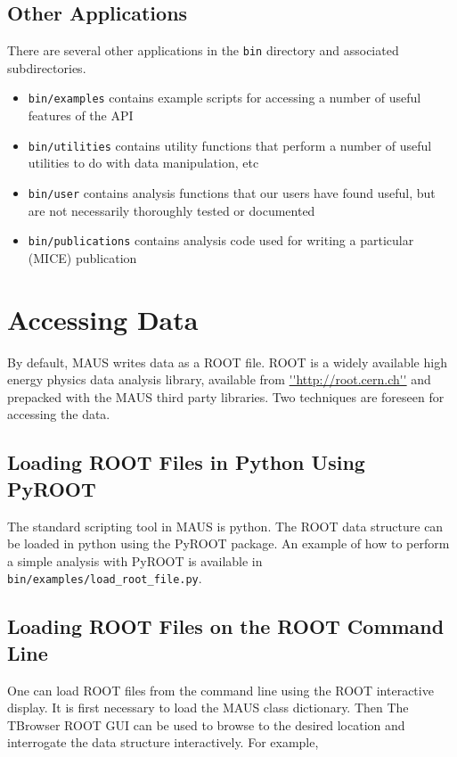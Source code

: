 \subsection{Other Applications}
There are several other applications in the \verb|bin| directory and associated subdirectories.
\begin{itemize}
\item \verb|bin/examples| contains example scripts for accessing a number of useful features of the API
\item \verb|bin/utilities| contains utility functions that perform a number of useful utilities to do with data manipulation, etc
\item \verb|bin/user| contains analysis functions that our users have found useful, but are not necessarily thoroughly tested or documented
\item \verb|bin/publications| contains analysis code used for writing a particular (MICE) publication
\end{itemize}

\section{Accessing Data}
By default, MAUS writes data as a ROOT file. ROOT is a widely available high energy physics data analysis library, available from \url{''http://root.cern.ch''} and prepacked with the MAUS third party libraries. Two techniques are foreseen for accessing the data.

\subsection{Loading ROOT Files in Python Using PyROOT}
The standard scripting tool in MAUS is python. The ROOT data structure can be loaded in python using the PyROOT package. An example of how to perform a simple analysis with PyROOT is available in \verb|bin/examples/load_root_file.py|.

\subsection{Loading ROOT Files on the ROOT Command Line}
One can load ROOT files from the command line using the ROOT interactive display. It is first necessary to load the MAUS class dictionary. Then The TBrowser ROOT GUI can be used to browse to the desired location and interrogate the data structure interactively. For example,

